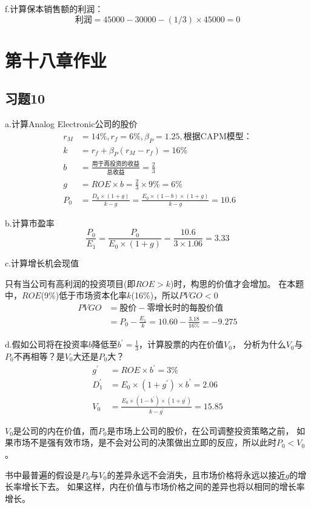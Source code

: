 \documentclass{article}
\begin{document}
f.计算保本销售额的利润：
\[\text{利润}=45000-30000-(1/3)\times 45000=0\]
\clearpage


\section*{\center 第十八章作业}
\subsection*{习题10}
a.计算Analog Electronic公司的股价
\begin{align}
    r_M&=14\%,r_f=6\%,\beta_P=1.25,\text{根据CAPM模型：}\\
    k&=r_f+\beta_P(r_M-r_f)=16\%\\
    b&=\frac{\text{用于再投资的收益}}{\text{总收益}}=\frac{2}{3}\\
    g&=ROE\times b=\frac{2}{3}\times 9\%=6\%\\
    P_0&=\frac{D_0\times (1+g)}{k-g}=\frac{E_0\times(1-b)\times(1+g)}{k-g}=10.6
\end{align}

b.计算市盈率
\[\frac{P_0}{E_1}=\frac{P_0}{E_0\times (1+g)}=\frac{10.6}{3\times 1.06}=3.33\]

c.计算增长机会现值

只有当公司有高利润的投资项目(即$ROE>k$)时，构思的价值才会增加。
在本题中，$ROE$(9\%)低于市场资本化率$k$(16\%)，所以$PVGO<0$
\begin{align}
    PVGO&=\text{股价}-\text{零增长时的每股价值}\\
    &=P_0-\frac{E_1}{k}=10.60-\frac{3.18}{16\%}=-9.275
\end{align}

d.假如公司将在投资率$b$降低至$b^{'}=\frac{1}{3}$，计算股票的内在价值$V_0$，
分析为什么$V_0$与$P_0$不再相等？是$V_0$大还是$P_0$大？
\begin{align}
    g^{'}&=ROE\times b^{'}=3\%\\
    D_1^{'}&=E_0\times (1+g^{'})\times b^{'}=2.06\\
    V_0&=\frac{E_0\times(1-b^{'})\times(1+g^{'})}{k-g^{'}}=15.85
\end{align}

$V_0$是公司的内在价值，而$P_0$是市场上公司的股价，在公司调整投资策略之前，
如果市场不是强有效市场，是不会对公司的决策做出立即的反应，所以此时$P_0<V_0$。

书中最普遍的假设是$P_0$与$V_0$的差异永远不会消失，且市场价格将永远以接近$g$的增长率增长下去。
如果这样，内在价值与市场价格之间的差异也将以相同的增长率增长。
\clearpage
\end{document}
